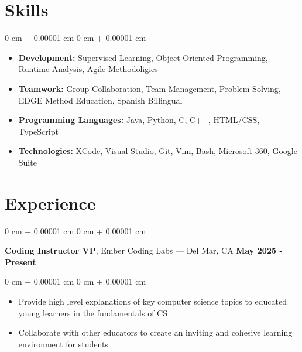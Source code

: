 \documentclass[10pt, letterpaper]{article}
\newenvironment{highlights}{
    \begin{itemize}[
        topsep=0.10 cm,
        parsep=0.10 cm,
        partopsep=0pt,
        itemsep=0pt,
        leftmargin=0 cm + 10pt
    ]
}{
    \end{itemize}
} %
\newenvironment{onecolentry}{
    \begin{adjustwidth}{
        0 cm + 0.00001 cm
    }{
        0 cm + 0.00001 cm
    }
}{
    \end{adjustwidth}
} %
\newenvironment{twocolentry}[2][]{
    \onecolentry%
    \def\secondColumn{#2}
    \setcolumnwidth{\fill, 4.5 cm}
    \begin{paracol}{2}
}{
    \switchcolumn\raggedleft\secondColumn%
    \end{paracol}
    \endonecolentry%
} %
\begin{document}
    
    
    {\color{secondaryColor}\section{Skills}}
        
        \begin{onecolentry}
            \begin{highlights}
                \item \textbf{Development:} Supervised Learning, Object-Oriented Programming, Runtime Analysis, Agile Methodoligies
                \item \textbf{Teamwork:} Group Collaboration, Team Management, Problem Solving, EDGE Method Education, Spanish Billingual
                \item \textbf{Programming Languages:} Java, Python, C, C++, HTML/CSS, TypeScript
                \item \textbf{Technologies:} XCode, Visual Studio, Git, Vim, Bash, Microsoft 360, Google Suite
            \end{highlights}
        \end{onecolentry}
    
    {\color{secondaryColor}\section{Experience}}


        
        \begin{twocolentry}{
            {\color{secondaryColor}\textbf{May 2025 - Present}}
        }
            \textbf{Coding Instructor VP}, Ember Coding Labs --- Del Mar, CA\end{twocolentry}

        \vspace{0.10 cm}
        \begin{onecolentry}
            \begin{highlights}
                \item Provide high level explanations of key computer science topics to educated young learners in the fundamentals of CS
                \item Collaborate with other educators to create an inviting and cohesive learning environment for students
            \end{highlights}
        \end{onecolentry}
\end{document}
